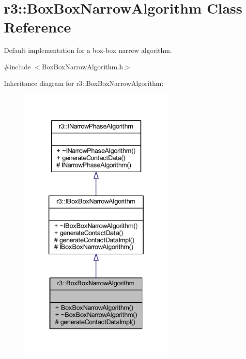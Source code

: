 \hypertarget{classr3_1_1_box_box_narrow_algorithm}{}\section{r3\+:\+:Box\+Box\+Narrow\+Algorithm Class Reference}
\label{classr3_1_1_box_box_narrow_algorithm}


Default implementation for a box-\/box narrow algorithm.  




{\ttfamily \#include $<$Box\+Box\+Narrow\+Algorithm.\+h$>$}



Inheritance diagram for r3\+:\+:Box\+Box\+Narrow\+Algorithm\+:\nopagebreak
\begin{figure}[H]
\begin{center}
\leavevmode
\includegraphics[width=226pt]{classr3_1_1_box_box_narrow_algorithm__inherit__graph}
\end{center}
\end{figure}


